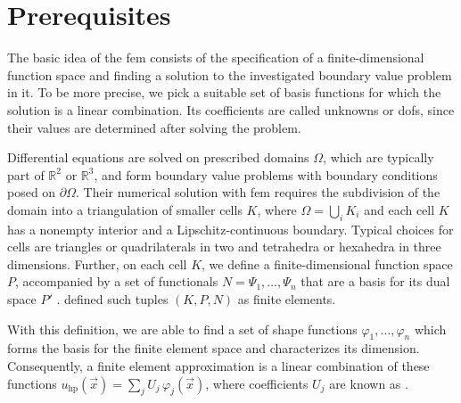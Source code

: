 \section{Prerequisites}
\label{sec:prerequisites}
\glsresetall


The basic idea of the \gls{fem} consists of the specification of a finite-dimensional function space and finding a solution to the investigated boundary value problem in it. To be more precise, we pick a suitable set of basis functions for which the solution is a linear combination. Its coefficients are called unknowns or \glspl{dof}, since their values are determined after solving the problem.

Differential equations are solved on prescribed domains $\Omega$, which are typically part of $\mathbb{R}^2$ or $\mathbb{R}^3$, and form boundary value problems with boundary conditions posed on $\partial \Omega$.
Their numerical solution with \gls{fem} requires the subdivision of the domain into a triangulation of smaller cells $K$, where $\Omega = \bigcup_{i} K_i$ and each cell $K$ has a nonempty interior and a Lipschitz-continuous boundary. Typical choices for cells are triangles or quadrilaterals in two and tetrahedra or hexahedra in three dimensions.
Further, on each cell $K$, we define a finite-dimensional function space $P$, accompanied by a set of functionals $N = {\Psi_1, \ldots, \Psi_n}$ that are a basis for its dual space $P'$
. \textcite[Sec.~2.1]{ciarlet1978} defined such tuples $(K,P,N)$ as finite elements.

With this definition, we are able to find a set of shape functions ${\varphi_1, \ldots, \varphi_n}$ which forms the basis for the finite element space and characterizes its dimension.
Consequently, a finite element approximation is a linear combination of these functions $u_{\text{hp}}(\vec{x}) = \sum_{j} U_j \, \varphi_j(\vec{x})$, where coefficients $U_j$ are known as .

